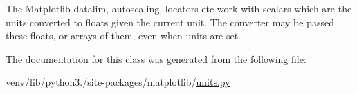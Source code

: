 \begin{DoxyVerb}The Matplotlib datalim, autoscaling, locators etc work with scalars
which are the units converted to floats given the current unit.  The
converter may be passed these floats, or arrays of them, even when
units are set.
\end{DoxyVerb}
 

The documentation for this class was generated from the following file\+:\begin{DoxyCompactItemize}
\item 
venv/lib/python3./site-\/packages/matplotlib/\hyperlink{units_8py}{units.\+py}\end{DoxyCompactItemize}
